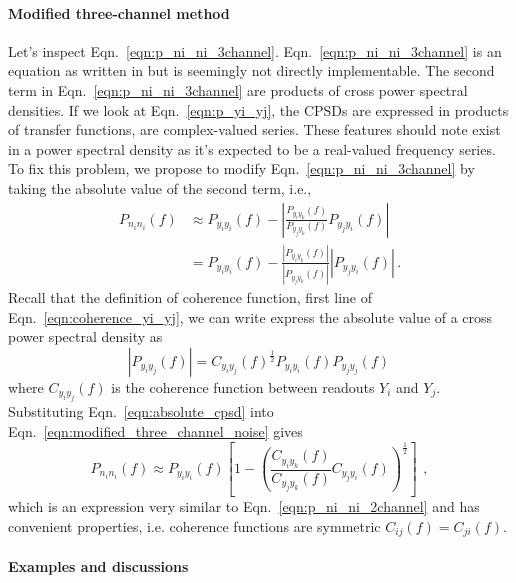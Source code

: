\paragraph{Modified three-channel method}

Let's inspect Eqn.~\eqref{eqn:p_ni_ni_3channel}.
Eqn.~\eqref{eqn:p_ni_ni_3channel} is an equation as written in \cite{Sleeman2006ThreeChannelCA} but is seemingly not directly implementable.
The second term in Eqn.~\eqref{eqn:p_ni_ni_3channel} are products of cross power spectral densities.
If we look at Eqn.~\eqref{eqn:p_yi_yj}, the CPSDs are expressed in products of transfer functions, are complex-valued series.
These features should note exist in a power spectral density as it's expected to be a real-valued frequency series.
To fix this problem, we propose to modify Eqn.~\ref{eqn:p_ni_ni_3channel} by taking the absolute value of the second term, i.e.,
\begin{equation}
	\begin{split}
	P_{n_in_i}(f) &\approx P_{y_iy_i}(f) - \left\lvert\frac{P_{y_iy_k}(f)}{P_{y_jy_k}(f)}P_{y_jy_i}(f)\right\rvert\\
	&= P_{y_iy_i}(f) - \frac{\left\lvert P_{y_iy_k}(f)\right\rvert}{\left\lvert P_{y_jy_k}(f)\right\rvert}\left\lvert P_{y_jy_i}(f)\right\rvert\,.
	\end{split}
	\label{eqn:modified_three_channel_noise}
\end{equation}
Recall that the definition of coherence function, first line of Eqn.~\eqref{eqn:coherence_yi_yj}, we can write express the absolute value of a cross power spectral density as
\begin{equation}
	\left\lvert P_{y_iy_j}(f)\right\rvert = C_{y_iy_j}(f)^{\frac{1}{2}}P_{y_iy_i}(f)P_{y_jy_j}(f)\,
	\label{eqn:absolute_cpsd}
\end{equation}
where $C_{y_iy_j}(f)$ is the coherence function between readouts $Y_i$ and $Y_j$.
Substituting Eqn.~\eqref{eqn:absolute_cpsd} into Eqn.~\eqref{eqn:modified_three_channel_noise} gives
\begin{equation}
	\boxed{
		P_{n_in_i}(f) \approx 	P_{y_iy_i}(f)\left[1-\left(\frac{C_{y_iy_k}(f)}{C_{y_jy_k}(f)}C_{y_jy_i}(f)\right)^\frac{1}{2}\right]
	}\,\ ,
	\label{eqn:modified_p_ni_ni_3channel}
\end{equation}
which is an expression very similar to Eqn.~\ref{eqn:p_ni_ni_2channel} and has convenient properties, i.e. coherence functions are symmetric $C_{ij}(f) = C_{ji}(f)$.

\paragraph{Examples and discussions}

